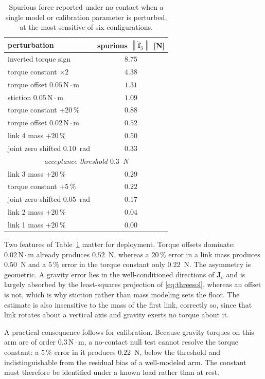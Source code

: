 \documentclass{ieeeaccess}
\newcommand{\norm}[1]{\left\| #1 \right\|}
\newcommand{\Jv}{\bm{J}_{\!v}}
\begin{document}
\begin{table}[!t]
\caption{Spurious force reported under no contact when a single model or
calibration parameter is perturbed, at the most sensitive of six configurations.}
\label{tab:faults}
\centering
\footnotesize
\setlength{\tabcolsep}{5pt}
\begin{tabular}{lc}
\toprule
perturbation & spurious $\norm{\hat{\bm f}_{3}}$ [N]\\
\midrule
inverted torque sign            & $8.75$\\
torque constant $\times2$       & $4.38$\\
torque offset $0.05\,\mathrm{N}\cdot\mathrm{m}$ & $1.31$\\
stiction $0.05\,\mathrm{N}\cdot\mathrm{m}$      & $1.09$\\
torque constant $+20\,\%$       & $0.88$\\
torque offset $0.02\,\mathrm{N}\cdot\mathrm{m}$ & $0.52$\\
link 4 mass $+20\,\%$           & $0.50$\\
joint zero shifted $0.10$~rad   & $0.33$\\
\midrule
\multicolumn{2}{c}{\emph{acceptance threshold $0.3$~N}}\\
\midrule
link 3 mass $+20\,\%$           & $0.29$\\
torque constant $+5\,\%$        & $0.22$\\
joint zero shifted $0.05$~rad   & $0.17$\\
link 2 mass $+20\,\%$           & $0.04$\\
link 1 mass $+20\,\%$           & $0.00$\\
\bottomrule
\end{tabular}
\end{table}

Two features of Table~\ref{tab:faults} matter for deployment. Torque offsets
dominate: $0.02\,\mathrm{N}\cdot\mathrm{m}$ already produces $0.52$~N, whereas a
$20\,\%$ error in a link mass produces $0.50$~N and a $5\,\%$ error in the torque
constant only $0.22$~N. The asymmetry is geometric. A gravity error lies in the
well-conditioned directions of $\Jv$ and is largely absorbed by the least-squares
projection of \eqref{eq:threesol}, whereas an offset is not, which is why stiction
rather than mass modeling sets the floor. The estimate is also insensitive to the
mass of the first link, correctly so, since that link rotates about a vertical axis
and gravity exerts no torque about it.

A practical consequence follows for calibration. Because gravity torques on this
arm are of order $0.3\,\mathrm{N}\cdot\mathrm{m}$, a no-contact null test cannot
resolve the torque constant: a $5\,\%$ error in it produces $0.22$~N, below the
threshold and indistinguishable from the residual bias of a well-modeled arm. The constant must therefore be identified
under a known load rather than at rest.
\end{document}
